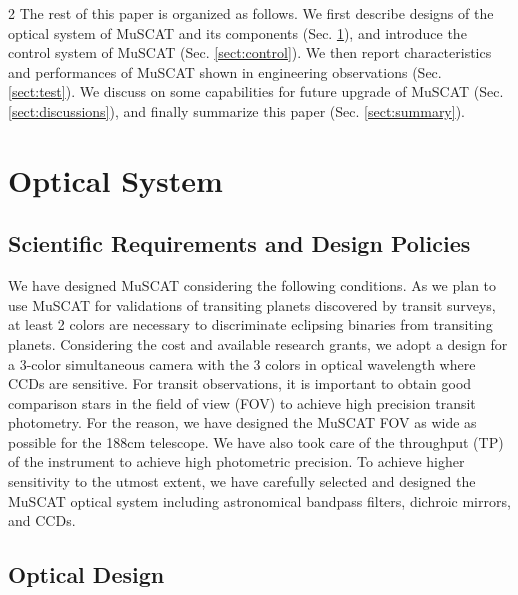 \documentclass[a4paper,12pt]{spieman}  %
\begin{document}
\begin{spacing}{2}
The rest of this paper is organized as follows.
We first describe designs of the optical system of MuSCAT and its components (Sec. \ref{sect:design}),
and introduce the control system of MuSCAT (Sec. \ref{sect:control}).
We then report characteristics and performances of MuSCAT shown
in engineering observations (Sec. \ref{sect:test}).
We discuss on some capabilities for future upgrade of MuSCAT (Sec. \ref{sect:discussions}),
and finally summarize this paper (Sec. \ref{sect:summary}).

\section{Optical System}
\label{sect:design}  %

\subsection{Scientific Requirements and Design Policies}
\label{subsec:requirements}

We have designed MuSCAT considering the following conditions.
As we plan to use MuSCAT for validations of transiting planets discovered by transit surveys,
at least 2 colors are necessary to discriminate eclipsing binaries from transiting planets.
Considering the cost and available research grants,
we adopt a design for a 3-color simultaneous camera 
with the 3 colors in optical wavelength where CCDs are sensitive.
For transit observations, it is important to obtain good comparison stars in the field of view (FOV)
to achieve high precision transit photometry.
For the reason, we have designed the MuSCAT FOV as wide as possible for the 188cm telescope.
We have also took care of the throughput (TP) of the instrument to achieve high photometric precision.
To achieve higher sensitivity to the utmost extent, we have carefully selected and designed
the MuSCAT optical system including astronomical bandpass filters, dichroic mirrors, and CCDs.

\subsection{Optical Design}
\label{subsec:overview}


\end{spacing}
\end{document}

